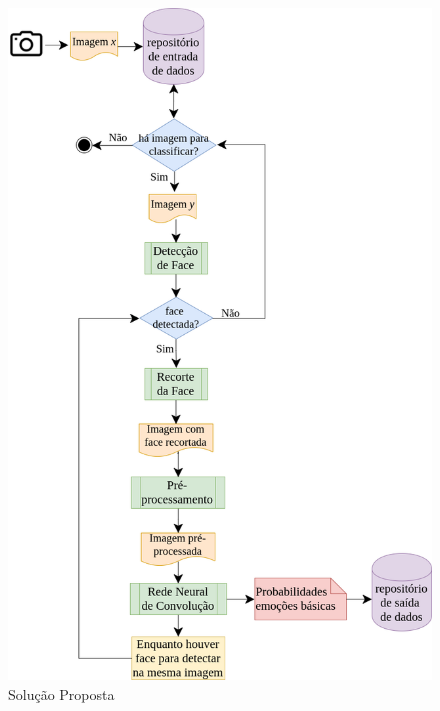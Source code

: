 
\begin{figure}
\centering
\includegraphics[scale=0.45]{figuras/arquitetura.png}
\caption{Solução Proposta}
\label{fig:arquitetura2}
\end{figure}

     

